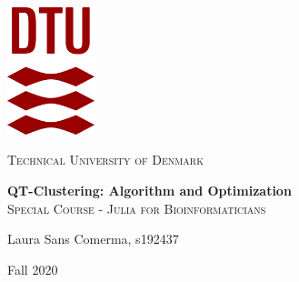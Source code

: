 \begin{titlepage}
    \begin{center}
    \vspace{0.2in}
	\includegraphics[width=0.19\textwidth]{images/Corp_Red_RGB.png}\par\vspace{1cm}
	{\scshape\LARGE 
	Technical University of Denmark
	\par}
	\vspace{2cm}
	\Huge{\textbf{
    QT-Clustering: Algorithm and Optimization
	\\}}
	\vspace{2cm}
	\Large{\textsc{
	Special Course - Julia for Bioinformaticians
	\\}}
	\vspace{2cm}
	{\Large

	
    Laura Sans Comerma, s192437\\
    \par}
    \vspace{3cm}
	{\large 
	Fall 2020
	\par}
	\vfill
	\end{center}
\end{titlepage}
